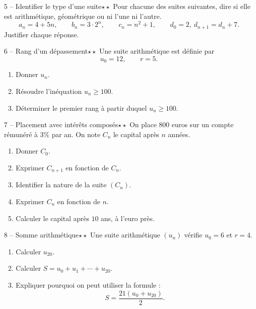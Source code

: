 \documentclass[11pt,a4paper]{article}
\newcommand{\deuxetoiles}{\(\star\star\)}
\begin{document}
\begin{exobox}{5 -- Identifier le type d'une suite}{\deuxetoiles}
Pour chacune des suites suivantes, dire si elle est arithmétique, géométrique ou ni l'une ni l'autre.
\[
a_n=4+5n,\qquad b_n=3\cdot 2^n,\qquad c_n=n^2+1,\qquad d_0=2,\ d_{n+1}=d_n+7.
\]
Justifier chaque réponse.
\end{exobox}

\begin{exobox}{6 -- Rang d'un dépassement}{\deuxetoiles}
Une suite arithmétique est définie par
\[
u_0=12,\qquad r=5.
\]
\begin{enumerate}[label=\alph*)]
  \item Donner \(u_n\).
  \item Résoudre l'inéquation \(u_n\geq 100\).
  \item Déterminer le premier rang à partir duquel \(u_n\geq 100\).
\end{enumerate}
\end{exobox}

\begin{exobox}{7 -- Placement avec intérêts composés}{\deuxetoiles}
On place \(800\) euros sur un compte rémunéré à \(3\%\) par an. On note \(C_n\) le capital après \(n\) années.
\begin{enumerate}[label=\alph*)]
  \item Donner \(C_0\).
  \item Exprimer \(C_{n+1}\) en fonction de \(C_n\).
  \item Identifier la nature de la suite \((C_n)\).
  \item Exprimer \(C_n\) en fonction de \(n\).
  \item Calculer le capital après \(10\) ans, à l'euro près.
\end{enumerate}
\end{exobox}

\begin{exobox}{8 -- Somme arithmétique}{\deuxetoiles}
Une suite arithmétique \((u_n)\) vérifie \(u_0=6\) et \(r=4\).
\begin{enumerate}[label=\alph*)]
  \item Calculer \(u_{20}\).
  \item Calculer \(S= u_0+u_1+\cdots+u_{20}\).
  \item Expliquer pourquoi on peut utiliser la formule :
  \[
  S=\frac{21(u_0+u_{20})}{2}.
  \]
\end{enumerate}
\end{exobox}
\end{document}
